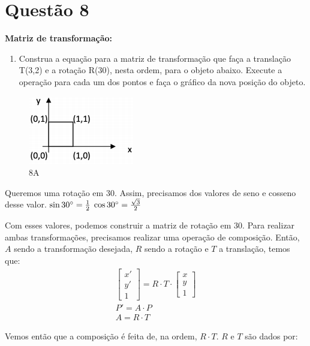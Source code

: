 \documentclass[12pt]{article}
\begin{document}
\section*{Questão 8}
{\bfseries Matriz de transformação:}

\begin{enumerate}[label=\alph*)]
    \item Construa a equação para a matriz de transformação que faça a translação T(3,2) e a rotação R(30\degree), nesta ordem, para o objeto abaixo. Execute a operação para cada um dos pontos e faça o gráfico da nova posição do objeto.
\end{enumerate}

\begin{figure}[H]
    \centering
    \includegraphics{images/8a.png}
    \caption{8A}
    \label{fig:8a}
\end{figure}

Queremos uma rotação em 30\degree. Assim, precisamos dos valores de seno e cosseno desse valor.
$\sin{30\degree} = \frac{1}{2}$ \hspace{2em} $\cos{30\degree} = \frac{\sqrt{3}}{2}$

Com esses valores, podemos construir a matriz de rotação em 30\degree. Para realizar ambas transformações, precisamos realizar uma operação de composição. Então, $A$ sendo a transformação desejada, $R$ sendo a rotação e $T$ a translação, temos que:
\begin{gather*}
    \begin{bmatrix}
    x' \\
    y' \\
    1
    \end{bmatrix}
    = R \cdot T \cdot
    \begin{bmatrix}
    x \\
    y \\
    1
    \end{bmatrix} \\
    P' = A \cdot P \\
    A = R \cdot T
\end{gather*}

Vemos então que a composição é feita de, na ordem, $R\cdot T$. $R$ e $T$ são dados por:
\end{document}
